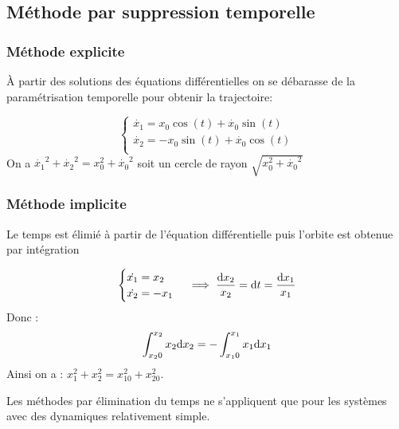\documentclass[main.tex]{subfiles}
\begin{document}
\subsection{Méthode par suppression temporelle}
\subsubsection{Méthode explicite}
À partir des solutions des équations différentielles on se débarasse de la paramétrisation temporelle pour obtenir la trajectoire:
\begin{exemple}
  \[
    \begin{cases}
      \dot{x_1} = x_0 \cos(t) + \dot{x_0} \sin(t)\\
      \dot{x_2} = -x_0 \sin(t) + \dot{x_0} \cos(t)\\
    \end{cases}
  \]
On a $\dot{x_1}^2+\dot{x_2}^2 = x_0^2+\dot{x_0}^2$ soit un cercle de rayon $\sqrt{x_0^2+\dot{x_0}^2}$
\end{exemple}

\subsubsection{Méthode implicite}

Le temps est élimié à partir de l'équation différentielle puis l'orbite est obtenue par intégration
\begin{exemple}
\[
  \begin{cases}
    \dot{x_1}=x_2\\
\dot{x_2} = -x_1
\end{cases}
\implies \frac{\mbox{d} x_2}{x_2} =\mbox{d} t = \frac{\mbox{d} x_1}{x_1}
\]
Donc : \[
  \int_{x_20}^{x_2}x_2\mbox{d} x_2 = - \int_{x_10}^{x_1}x_1\mbox{d} x_1
\]
Ainsi on a : $ x_1^2+x_2^2 = x_{10}^2+x_{20}^2$.
\end{exemple}

\begin{rem}
  Les méthodes par élimination du temps ne s'appliquent que pour les systèmes avec des dynamiques relativement simple.
\end{rem}
\end{document}
